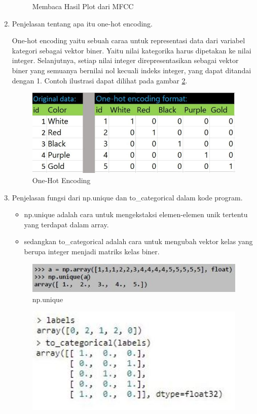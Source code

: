 \begin{enumerate}
\begin{figure}[!htbp]
\caption{Membaca Hasil Plot dari MFCC}
\label{c6t_5}
\end{figure} 
\item Penjelasan tentang apa itu one-hot encoding.
\par One-hot encoding yaitu sebuah caraa untuk representasi data dari variabel kategori sebagai vektor biner. Yaitu nilai kategorika harus dipetakan ke nilai integer. Selanjutnya, setiap nilai integer direpresentasikan sebagai vektor biner yang semuanya bernilai nol kecuali indeks integer, yang dapat ditandai dengan 1. Contoh ilustrasi dapat dilihat pada gambar \ref{c6t_6}.
\begin{figure}[!htbp]
\centerline{\includegraphics[width=1\textwidth]{figures/c6t/6.JPG}}
\caption{One-Hot Encoding}
\label{c6t_6}
\end{figure} 
\item Penjelasan fungsi dari np.unique dan to\_categorical dalam kode program.
\begin{itemize}
\item np.unique adalah cara untuk mengekstaksi elemen-elemen unik tertentu yang terdapat dalam array.
\item sedangkan to\_categorical adalah cara untuk mengubah vektor kelas yang berupa integer menjadi matriks kelas biner.
\end{itemize}
\begin{figure}[!htbp]
\centerline{\includegraphics[width=1\textwidth]{figures/c6t/7.JPG}}
\caption{np.unique}
\end{figure} 
\begin{figure}[!htbp]
\centerline{\includegraphics[width=1\textwidth]{figures/c6t/7_1.JPG}}

\end{figure}
\end{enumerate}
